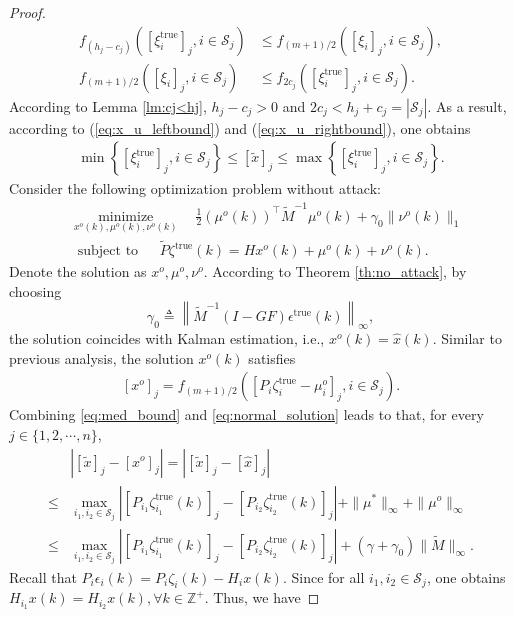 \documentclass{ieeetrans}   %
\newcommand{\Zb}{{\mathbb{Z}}}
\newcommand{\Sc}{{\mathcal{S}}}
\newcommand{\ift}{{\infty}}
\newcommand{\re}{\text{true}}
\newtheorem*{proof}{\textbf{Proof}}
\begin{document}
\begin{proof}
	\begin{align}	
		f_{(h_j-c_j)}\left([\xi^\re_i]_j, i\in\Sc_j\right) &\leq
		f_{(m+1)/2}\left([\xi_i]_j, i\in\Sc_j\right), \label{eq:x_u_leftbound}\\
		f_{(m+1)/2}\left([\xi_i]_j, i\in\Sc_j\right)&\leq 
		f_{2c_j}\left([\xi^\re_i]_j, i\in\Sc_j\right) .  \label{eq:x_u_rightbound}
	\end{align}
	According to Lemma \ref{lm:cj<hj}, $h_j-c_j>0$ and $2c_j<h_j+c_j=|\Sc_j|$.
	As a result, according to (\ref{eq:x_u_leftbound}) and (\ref{eq:x_u_rightbound}), one obtains
	\begin{align}\label{eq:med_bound}
		\min \left\{ [\xi^\re_i]_j, i\in\Sc_j \right\}\leq [\tilde{x}]_j\leq \max \left\{ [\xi^\re_i]_j, i\in\Sc_j \right\}.
	\end{align}
	Consider the following optimization problem without attack:
	\begin{align*}
		&\underset{{x}^o(k), \mu^o(k),\nu^o(k)}{\operatorname{minimize}}\quad \frac{1}{2} (\mu^o(k))^\top \tilde{M}^{-1} \mu^o(k) + \gamma_0\|\nu^o(k)\|_1 \\
		&\ \text{ subject to }\quad \
		\tilde{P}\zeta^\re(k)=H {x}^o(k) +\mu^o(k)+\nu^o(k). 
	\end{align*}
	Denote the solution as $x^o, \mu^o, \nu^o$. 
	According to Theorem \ref{th:no_attack}, by choosing 
	$$\gamma_0\triangleq \left\| \tilde{M}^{-1}\left(I-GF\right) \epsilon^\re(k) \right\|_{\infty} ,$$
	the solution coincides with Kalman estimation, i.e., $x^o(k)=\hat{x}(k)$.
	Similar to previous analysis, the solution $x^o(k)$ satisfies 
	\begin{align}\label{eq:normal_solution}
		[x^o]_j=f_{(m+1)/2}\left( [P_i\zeta_{i}^\re-\mu^o_i]_j, i\in\Sc_j \right).
	\end{align}
	Combining \eqref{eq:med_bound} and \eqref{eq:normal_solution} leads to that, for every $j\in\{1,2,\cdots,n\}$,
	\begin{align*}
		&\left|[\tilde{x}]_j-[x^o]_j\right| =\left|[\tilde{x}]_j-[\hat{x}]_j\right|\\
		\leq &
		\max_{i_1,i_2\in \Sc_j} \left| \left[P_{i_1} \zeta^\re_{i_1}(k)\right]_j- \left[P_{i_2} \zeta^\re_{i_2}(k)\right]_j \right| 
		+ \|\mu^*\|_\infty+ \|\mu^o\|_\infty\\
		\leq& \max_{i_1,i_2\in \Sc_j} \left| \left[P_{i_1} \zeta^\re_{i_1}(k)\right]_j- \left[P_{i_2} \zeta^\re_{i_2}(k)\right]_j \right| +(\gamma+\gamma_0)\|\tilde{M}\|_\ift.
	\end{align*}
Recall that $P_i\epsilon_{i}(k)=P_i \zeta_i (k)-H_ix(k)$. Since for all $i_1,i_2\in \Sc_j$, one obtains $H_{i_1}x(k)=H_{i_2}x(k),\forall k\in\Zb^+$. Thus, we have

\end{proof}
\end{document}
